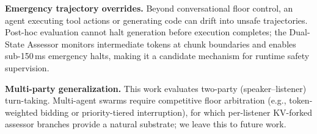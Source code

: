 \documentclass{article}
\begin{document}
\textbf{Emergency trajectory overrides.} Beyond conversational floor control, an agent executing tool actions or generating code can drift into unsafe trajectories. Post-hoc evaluation cannot halt generation before execution completes; the Dual-State Assessor monitors intermediate tokens at chunk boundaries and enables sub-150\,ms emergency halts, making it a candidate mechanism for runtime safety supervision.

\textbf{Multi-party generalization.} This work evaluates two-party (speaker--listener) turn-taking. Multi-agent swarms require competitive floor arbitration (e.g., token-weighted bidding or priority-tiered interruption), for which per-listener KV-forked assessor branches provide a natural substrate; we leave this to future work.
\end{document}
